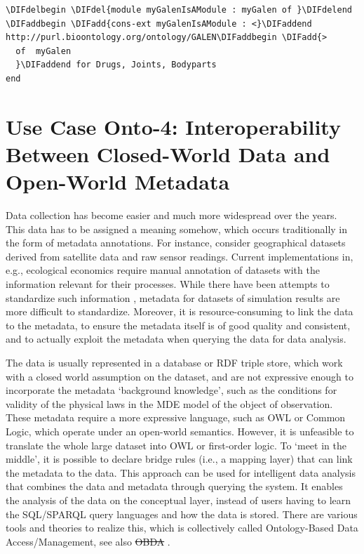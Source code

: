 \documentclass[10pt,fleqn,final]{scrreprt}
\newcommand*{\termref}[1]{\index{#1}#1\xspace}
\newenvironment{definitions}[0]{\medskip }{}
\providecommand{\DIFadd}[1]{{\protect\color{blue}\uwave{#1}}} %
\providecommand{\DIFdel}[1]{{\protect\color{red}\sout{#1}}}                      %
\providecommand{\DIFaddbegin}{} %
\providecommand{\DIFaddend}{} %
\providecommand{\DIFdelbegin}{} %
\providecommand{\DIFdelend}{} %
\begin{document}
\begin{definitions}
\begin{lstlisting}[basicstyle=\ttfamily,language=dolText,escapechar=@,mathescape]
\DIFdelbegin \DIFdel{module myGalenIsAModule : myGalen of }\DIFdelend \DIFaddbegin \DIFadd{cons-ext myGalenIsAModule : <}\DIFaddend http://purl.bioontology.org/ontology/GALEN\DIFaddbegin \DIFadd{>
  of  myGalen 
  }\DIFaddend for Drugs, Joints, Bodyparts
end
\end{lstlisting}



\section{Use Case Onto-4: Interoperability Between Closed-World Data and Open-World Metadata}
Data collection has become easier and much more widespread over the years. This data has to be 
assigned a meaning somehow, which occurs traditionally in the  form of metadata annotations. For 
instance, consider geographical datasets derived from satellite data and raw sensor readings. 
Current implementations in, e.g., ecological economics \cite{bagstad_aries_2011} require manual 
annotation of datasets with the information relevant for their processes. While there have been 
attempts to standardize such information \cite{european_comission_inspire_2014}, metadata for 
datasets of simulation results are more difficult to standardize. Moreover, it is 
resource-consuming to link the data to the metadata, to ensure the metadata itself is of good 
quality and consistent, and to actually exploit the metadata when querying the data for data 
analysis. 

The data is usually represented in a database or RDF triple store, which work with a \termref{closed world assumption} on the dataset, and are not expressive enough to 
incorporate the metadata `background knowledge', such as the conditions for validity of the physical laws in the MDE model of the object of observation. These metadata 
require a more expressive language, such as OWL or Common Logic, which operate under an open-world semantics. However, it is unfeasible to translate the 
whole large dataset into OWL or first-order logic. To `meet in the middle', it is possible to declare bridge rules (i.e., a mapping layer) that can link the metadata to 
the data. This approach can be used for intelligent data analysis that combines the data and metadata through querying the system. It enables the analysis of the 
data on the conceptual layer, instead of users having to learn the SQL/SPARQL query languages and how the data is stored. There are various tools and theories 
to realize this, which is collectively called Ontology-Based Data Access/Management, see also \DIFdelbegin %
\DIFdel{OBDA}%
\DIFdelend \DIFaddbegin \DIFadd{\mbox{%
\cite{CalvaneseEtAl11}
}%
}\DIFaddend .


\end{definitions}
\end{document}
